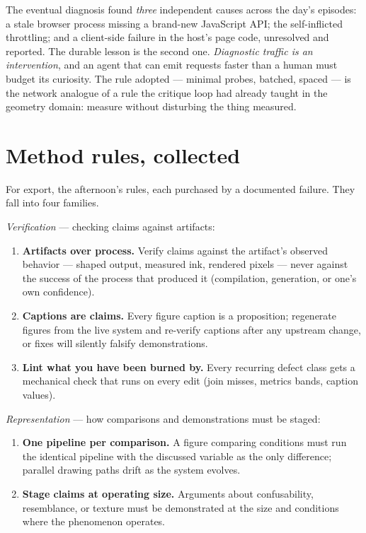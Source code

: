 \documentclass[12pt]{article}
\begin{document}
The eventual diagnosis found \emph{three} independent causes across the day's episodes: a stale browser process missing a brand-new JavaScript API; the self-inflicted throttling; and a client-side failure in the host's page code, unresolved and reported. The durable lesson is the second one. \emph{Diagnostic traffic is an intervention}, and an agent that can emit requests faster than a human must budget its curiosity. The rule adopted — minimal probes, batched, spaced — is the network analogue of a rule the critique loop had already taught in the geometry domain: measure without disturbing the thing measured.

\section{Method rules, collected}\label{sec:rules}

For export, the afternoon's rules, each purchased by a documented failure. They fall into four families.

\emph{Verification} — checking claims against artifacts:
\begin{enumerate}\itemsep2pt
\item \textbf{Artifacts over process.} Verify claims against the artifact's observed behavior — shaped output, measured ink, rendered pixels — never against the success of the process that produced it (compilation, generation, or one's own confidence).
\item \textbf{Captions are claims.} Every figure caption is a proposition; regenerate figures from the live system and re-verify captions after any upstream change, or fixes will silently falsify demonstrations.
\item \textbf{Lint what you have been burned by.} Every recurring defect class gets a mechanical check that runs on every edit (join misses, metrics bands, caption values).
\end{enumerate}

\emph{Representation} — how comparisons and demonstrations must be staged:
\begin{enumerate}\itemsep2pt\setcounter{enumi}{3}
\item \textbf{One pipeline per comparison.} A figure comparing conditions must run the identical pipeline with the discussed variable as the only difference; parallel drawing paths drift as the system evolves.
\item \textbf{Stage claims at operating size.} Arguments about confusability, resemblance, or texture must be demonstrated at the size and conditions where the phenomenon operates.
\end{enumerate}
\end{document}
